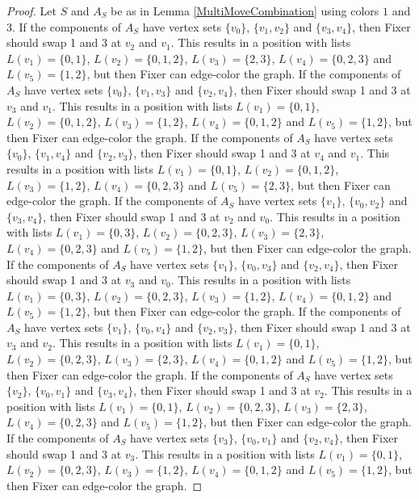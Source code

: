 \documentclass[12pt]{amsart}
\theoremstyle{plain}
\theoremstyle{definition}
\theoremstyle{remark}
\begin{document}
\begin{proof}
Let $S$ and $A_S$ be as in Lemma \ref{MultiMoveCombination} using colors $1$ and $3$. If the components of $A_S$ have vertex sets $\{v_0\}$, $\{v_1, v_2\}$ and $\{v_3, v_4\}$, then Fixer should swap 1 and 3 at $v_2$ and $v_1$. This results in a position with lists $L(v_1) = \{0, 1\}$, $L(v_2) = \{0, 1, 2\}$, $L(v_3) = \{2, 3\}$, $L(v_4) = \{0, 2, 3\}$ and $L(v_5) = \{1, 2\}$, but then Fixer can edge-color the graph.
If the components of $A_S$ have vertex sets $\{v_0\}$, $\{v_1, v_3\}$ and $\{v_2, v_4\}$, then Fixer should swap 1 and 3 at $v_3$ and $v_1$. This results in a position with lists $L(v_1) = \{0, 1\}$, $L(v_2) = \{0, 1, 2\}$, $L(v_3) = \{1, 2\}$, $L(v_4) = \{0, 1, 2\}$ and $L(v_5) = \{1, 2\}$, but then Fixer can edge-color the graph.
If the components of $A_S$ have vertex sets $\{v_0\}$, $\{v_1, v_4\}$ and $\{v_2, v_3\}$, then Fixer should swap 1 and 3 at $v_4$ and $v_1$. This results in a position with lists $L(v_1) = \{0, 1\}$, $L(v_2) = \{0, 1, 2\}$, $L(v_3) = \{1, 2\}$, $L(v_4) = \{0, 2, 3\}$ and $L(v_5) = \{2, 3\}$, but then Fixer can edge-color the graph.
If the components of $A_S$ have vertex sets $\{v_1\}$, $\{v_0, v_2\}$ and $\{v_3, v_4\}$, then Fixer should swap 1 and 3 at $v_2$ and $v_0$. This results in a position with lists $L(v_1) = \{0, 3\}$, $L(v_2) = \{0, 2, 3\}$, $L(v_3) = \{2, 3\}$, $L(v_4) = \{0, 2, 3\}$ and $L(v_5) = \{1, 2\}$, but then Fixer can edge-color the graph.
If the components of $A_S$ have vertex sets $\{v_1\}$, $\{v_0, v_3\}$ and $\{v_2, v_4\}$, then Fixer should swap 1 and 3 at $v_3$ and $v_0$. This results in a position with lists $L(v_1) = \{0, 3\}$, $L(v_2) = \{0, 2, 3\}$, $L(v_3) = \{1, 2\}$, $L(v_4) = \{0, 1, 2\}$ and $L(v_5) = \{1, 2\}$, but then Fixer can edge-color the graph.
If the components of $A_S$ have vertex sets $\{v_1\}$, $\{v_0, v_4\}$ and $\{v_2, v_3\}$, then Fixer should swap 1 and 3 at $v_3$ and $v_2$. This results in a position with lists $L(v_1) = \{0, 1\}$, $L(v_2) = \{0, 2, 3\}$, $L(v_3) = \{2, 3\}$, $L(v_4) = \{0, 1, 2\}$ and $L(v_5) = \{1, 2\}$, but then Fixer can edge-color the graph.
If the components of $A_S$ have vertex sets $\{v_2\}$, $\{v_0, v_1\}$ and $\{v_3, v_4\}$, then Fixer should swap 1 and 3 at $v_2$. This results in a position with lists $L(v_1) = \{0, 1\}$, $L(v_2) = \{0, 2, 3\}$, $L(v_3) = \{2, 3\}$, $L(v_4) = \{0, 2, 3\}$ and $L(v_5) = \{1, 2\}$, but then Fixer can edge-color the graph.
If the components of $A_S$ have vertex sets $\{v_3\}$, $\{v_0, v_1\}$ and $\{v_2, v_4\}$, then Fixer should swap 1 and 3 at $v_3$. This results in a position with lists $L(v_1) = \{0, 1\}$, $L(v_2) = \{0, 2, 3\}$, $L(v_3) = \{1, 2\}$, $L(v_4) = \{0, 1, 2\}$ and $L(v_5) = \{1, 2\}$, but then Fixer can edge-color the graph.

\end{proof}
\end{document}
